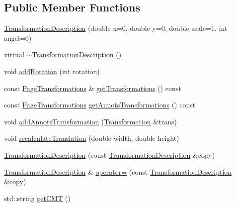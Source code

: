 \subsection*{Public Member Functions}
\begin{DoxyCompactItemize}
\item 
\hyperlink{classmerge__lib_1_1_transformation_description_a4678e77ab1a1c2f060956b8324bd0d3a}{Transformation\-Description} (double x=0, double y=0, double scale=1, int angel=0)
\item 
virtual \hyperlink{classmerge__lib_1_1_transformation_description_af94366ffca96f218262a16f31901c2ee}{$\sim$\-Transformation\-Description} ()
\item 
void \hyperlink{classmerge__lib_1_1_transformation_description_a68d44b6cf26f1f689393885bb86395c5}{add\-Rotation} (int rotation)
\item 
const \hyperlink{namespacemerge__lib_abbc56c33e072a8c7b4494d50942a06a4}{Page\-Transformations} \& \hyperlink{classmerge__lib_1_1_transformation_description_a99d859006aaba9acf0c68720c44102e4}{get\-Transformations} () const 
\item 
const \hyperlink{namespacemerge__lib_abbc56c33e072a8c7b4494d50942a06a4}{Page\-Transformations} \hyperlink{classmerge__lib_1_1_transformation_description_a48c49b8907e3e31ab7c0258ee44ef39c}{get\-Annots\-Transformations} () const 
\item 
void \hyperlink{classmerge__lib_1_1_transformation_description_aef2633d366039a1fa17def04598fbba6}{add\-Annots\-Transformation} (\hyperlink{classmerge__lib_1_1_transformation}{Transformation} \&trans)
\item 
void \hyperlink{classmerge__lib_1_1_transformation_description_aa3f45594e5ba11d8e6050c6df53cee67}{recalculate\-Translation} (double width, double height)
\item 
\hyperlink{classmerge__lib_1_1_transformation_description_af53d4cef5310847cec364c6dd73d9c8c}{Transformation\-Description} (const \hyperlink{classmerge__lib_1_1_transformation_description}{Transformation\-Description} \&copy)
\item 
\hyperlink{classmerge__lib_1_1_transformation_description}{Transformation\-Description} \& \hyperlink{classmerge__lib_1_1_transformation_description_a6afb8d82adf4fa79ea179015472eefd6}{operator=} (const \hyperlink{classmerge__lib_1_1_transformation_description}{Transformation\-Description} \&copy)
\item 
std\-::string \hyperlink{classmerge__lib_1_1_transformation_description_ac52c451791b0ad66e48252e28da04fc5}{get\-C\-M\-T} ()
\end{DoxyCompactItemize}


